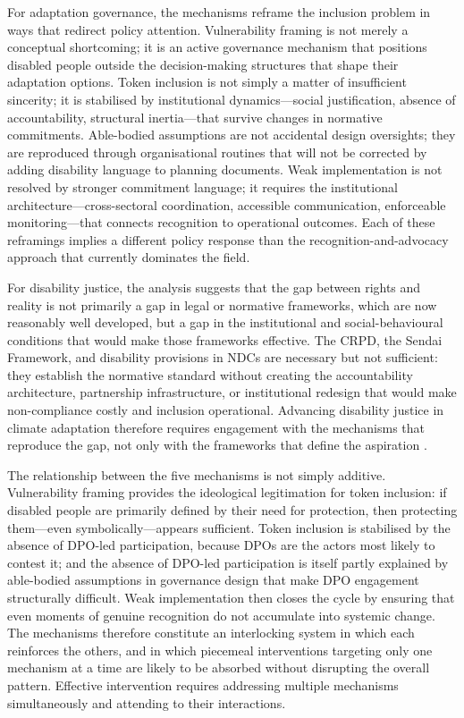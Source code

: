 \documentclass[12pt,a4paper]{article}
\begin{document}
For adaptation governance, the mechanisms reframe the inclusion problem in ways that redirect policy attention. Vulnerability framing is not merely a conceptual shortcoming; it is an active governance mechanism that positions disabled people outside the decision-making structures that shape their adaptation options. Token inclusion is not simply a matter of insufficient sincerity; it is stabilised by institutional dynamics---social justification, absence of accountability, structural inertia---that survive changes in normative commitments. Able-bodied assumptions are not accidental design oversights; they are reproduced through organisational routines that will not be corrected by adding disability language to planning documents. Weak implementation is not resolved by stronger commitment language; it requires the institutional architecture---cross-sectoral coordination, accessible communication, enforceable monitoring---that connects recognition to operational outcomes. Each of these reframings implies a different policy response than the recognition-and-advocacy approach that currently dominates the field.

For disability justice, the analysis suggests that the gap between rights and reality is not primarily a gap in legal or normative frameworks, which are now reasonably well developed, but a gap in the institutional and social-behavioural conditions that would make those frameworks effective. The CRPD, the Sendai Framework, and disability provisions in NDCs are necessary but not sufficient: they establish the normative standard without creating the accountability architecture, partnership infrastructure, or institutional redesign that would make non-compliance costly and inclusion operational. Advancing disability justice in climate adaptation therefore requires engagement with the mechanisms that reproduce the gap, not only with the frameworks that define the aspiration \cite{stein2022disability,Polack2008}.

The relationship between the five mechanisms is not simply additive. Vulnerability framing provides the ideological legitimation for token inclusion: if disabled people are primarily defined by their need for protection, then protecting them---even symbolically---appears sufficient. Token inclusion is stabilised by the absence of DPO-led participation, because DPOs are the actors most likely to contest it; and the absence of DPO-led participation is itself partly explained by able-bodied assumptions in governance design that make DPO engagement structurally difficult. Weak implementation then closes the cycle by ensuring that even moments of genuine recognition do not accumulate into systemic change. The mechanisms therefore constitute an interlocking system in which each reinforces the others, and in which piecemeal interventions targeting only one mechanism at a time are likely to be absorbed without disrupting the overall pattern. Effective intervention requires addressing multiple mechanisms simultaneously and attending to their interactions.
\end{document}
